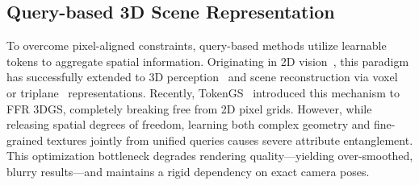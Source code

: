 \documentclass[letterpaper]{article} %
\begin{document}

\subsection{Query-based 3D Scene Representation}
To overcome pixel-aligned constraints, query-based methods utilize learnable tokens to aggregate spatial information. Originating in 2D vision~\cite{carion2020detr}, this paradigm has successfully extended to 3D perception~\cite{wang2022detr3d, schult2023mask3d} and scene reconstruction via voxel~\cite{li2023voxformer} or triplane~\cite{hong2024lrm} representations. Recently, TokenGS~\cite{ren2026tokengs} introduced this mechanism to FFR 3DGS, completely breaking free from 2D pixel grids. However, while releasing spatial degrees of freedom, learning both complex geometry and fine-grained textures jointly from unified queries causes severe attribute entanglement. This optimization bottleneck degrades rendering quality—yielding over-smoothed, blurry results—and maintains a rigid dependency on exact camera poses.
\end{document}
